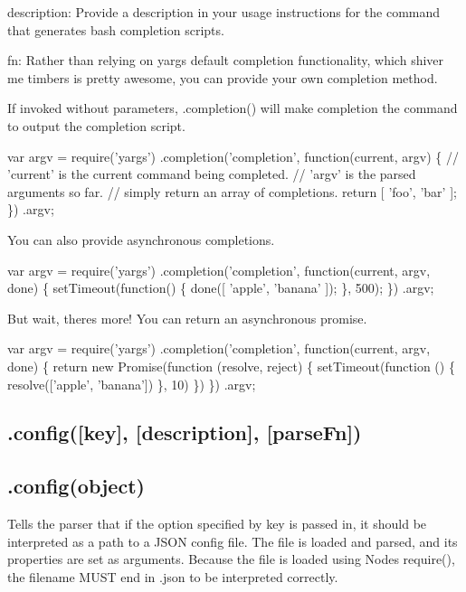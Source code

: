 {\ttfamily description}\+: Provide a description in your usage instructions for the command that generates bash completion scripts.

{\ttfamily fn}\+: Rather than relying on yargs\textquotesingle{} default completion functionality, which shiver me timbers is pretty awesome, you can provide your own completion method.

If invoked without parameters, {\ttfamily .completion()} will make {\ttfamily completion} the command to output the completion script.


\begin{DoxyCode}
var argv = require('yargs')
  .completion('completion', function(current, argv) \{
    // 'current' is the current command being completed.
    // 'argv' is the parsed arguments so far.
    // simply return an array of completions.
    return [
      'foo',
      'bar'
    ];
  \})
  .argv;
\end{DoxyCode}


You can also provide asynchronous completions.


\begin{DoxyCode}
var argv = require('yargs')
  .completion('completion', function(current, argv, done) \{
    setTimeout(function() \{
      done([
        'apple',
        'banana'
      ]);
    \}, 500);
  \})
  .argv;
\end{DoxyCode}


But wait, there\textquotesingle{}s more! You can return an asynchronous promise.


\begin{DoxyCode}
var argv = require('yargs')
  .completion('completion', function(current, argv, done) \{
    return new Promise(function (resolve, reject) \{
      setTimeout(function () \{
        resolve(['apple', 'banana'])
      \}, 10)
    \})
  \})
  .argv;
\end{DoxyCode}


\subsection*{\label{_config}%
.config(\mbox{[}key\mbox{]}, \mbox{[}description\mbox{]}, \mbox{[}parse\+Fn\mbox{]}) }

\subsection*{.config(object) }

Tells the parser that if the option specified by {\ttfamily key} is passed in, it should be interpreted as a path to a J\+S\+ON config file. The file is loaded and parsed, and its properties are set as arguments. Because the file is loaded using Node\textquotesingle{}s require(), the filename M\+U\+ST end in {\ttfamily .json} to be interpreted correctly.

